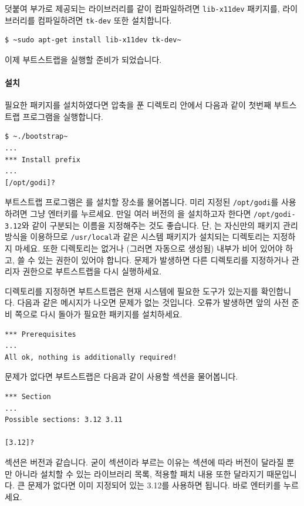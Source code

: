 덧붙여 부가로 제공되는 \GRAPHICS{} 라이브러리를 같이 컴파일하려면
\texttt{lib-x11dev} 패키지를, \LABLTK{} 라이브러리를 컴파일하려면
\texttt{tk-dev} 또한 설치합니다.

\begin{lstlisting}
$ ~sudo apt-get install lib-x11dev tk-dev~
\end{lstlisting}

이제 부트스트랩을 실행할 준비가 되었습니다.

\paragraph{설치} 필요한 패키지를 설치하였다면 압축을 푼 디렉토리
안에서 다음과 같이 첫번째 부트스트랩 프로그램을 실행합니다.

\begin{lstlisting}
$ ~./bootstrap~
...
*** Install prefix
...
[/opt/godi]?
\end{lstlisting}

부트스트랩 프로그램은 \GODI{}를 설치할 장소를 물어봅니다. 미리 지정된
\texttt{/opt/godi}를 사용하려면 그냥 엔터키를 누르세요. 만일 여러 버전의
\OCAML{}을 설치하고자 한다면 \texttt{/opt/godi-3.12}와 같이 구분되는 이름을
지정해주는 것도 좋습니다. 단, \GODI{}는 자신만의 패키지 관리 방식을
이용하므로 \texttt{/usr/local}과 같은 시스템 패키지가 설치되는 디렉토리는
지정하지 마세요. 또한 디렉토리는 없거나 (그러면 자동으로 생성됨) 내부가 비어
있어야 하고, 쓸 수 있는 권한이 있어야 합니다. 문제가 발생하면 다른 디렉토리를
지정하거나 관리자 권한으로 부트스트랩을 다시 실행하세요.

디렉토리를 지정하면 부트스트랩은 현재 시스템에 필요한 도구가 있는지를
확인합니다. 다음과 같은 메시지가 나오면 문제가 없는 것입니다. 오류가 발생하면
앞의 사전 준비 쪽으로 다시 돌아가 필요한 패키지를 설치하세요.

\begin{lstlisting}
*** Prerequisites
...
All ok, nothing is additionally required!
\end{lstlisting}

문제가 없다면 부트스트랩은 다음과 같이 사용할 섹션을 물어봅니다.

\begin{lstlisting}
*** Section
...
Possible sections: 3.12 3.11

[3.12]?
\end{lstlisting}

섹션은 \OCAML{} 버전과 같습니다. 굳이 섹션이라 부르는 이유는 섹션에 따라
\OCAML{} 버전이 달라질 뿐만 아니라 설치할 수 있는 라이브러리 목록, 적용할 패치
내용 또한 달라지기 때문입니다. 큰 문제가 없다면 이미 지정되어 있는 3.12를
사용하면 됩니다. 바로 엔터키를 누르세요.

